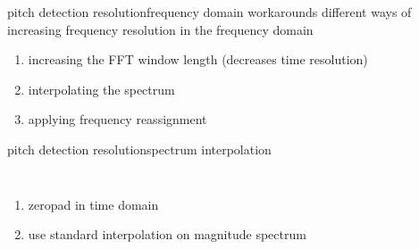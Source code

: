         \begin{frame}{pitch detection resolution}{frequency domain workarounds}
            different ways of increasing frequency resolution in the frequency domain
						\bigskip
            \begin{enumerate}
                \item<1->   increasing the FFT window length (decreases time resolution)
                \bigskip
                \item<2->   interpolating  the spectrum
                \bigskip
                \item<3->   applying frequency reassignment
            \end{enumerate}
        \end{frame}

        \begin{frame}{pitch detection resolution}{spectrum interpolation}
            \begin{columns}
						\vspace{10mm}
            \begin{enumerate}
                \item<1->   zeropad in time domain
                \bigskip
                \bigskip
                \bigskip
                \item<1->   use standard interpolation on magnitude spectrum
            \end{enumerate}
            \end{columns}
        \end{frame}
				
